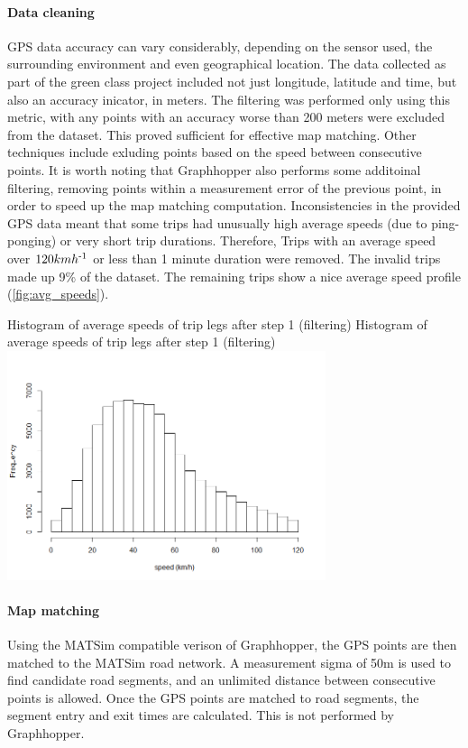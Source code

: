 \paragraph{Data cleaning}
GPS data accuracy can vary considerably, depending on the sensor used, the surrounding environment and even geographical location. 
The data collected as part of the green class project included not just longitude, latitude and time, but also an accuracy inicator, in meters. 
The filtering was performed only using this metric, with any points with an accuracy worse than 200 meters were excluded from the dataset. 
This proved sufficient for effective map matching. Other techniques include exluding points based on the speed between consecutive points. 
It is worth noting that Graphhopper also performs some additoinal filtering, removing points within a measurement error of the previous point, in order to speed up the map matching computation. Inconsistencies in the provided GPS data meant that some trips had unusually high average speeds (due to ping-ponging) or very short trip durations. Therefore, Trips with an average speed over $120 kmh\textsuperscript{-1}$ or less than 1 minute duration were removed. The invalid trips made up 9\% of the dataset. The remaining trips show a nice average speed profile (\ref{fig:avg_speeds}).

\createfigure%
	{Histogram of average speeds of trip legs after step 1 (filtering)}
	{Histogram of average speeds of trip legs after step 1 (filtering)}
    {\label{fig:avg_speeds}}
    {\includegraphics[width=0.7\textwidth]{figures/avg_speed_green_class_matched}}
	{}

\paragraph{Map matching}
Using the MATSim compatible verison of Graphhopper, the GPS points are then matched to the MATSim road network. A measurement sigma of 50m is used to find candidate road segments, and an unlimited distance between consecutive points is allowed. Once the GPS points are matched to road segments, the segment entry and exit times are calculated. This is not performed by Graphhopper.  

